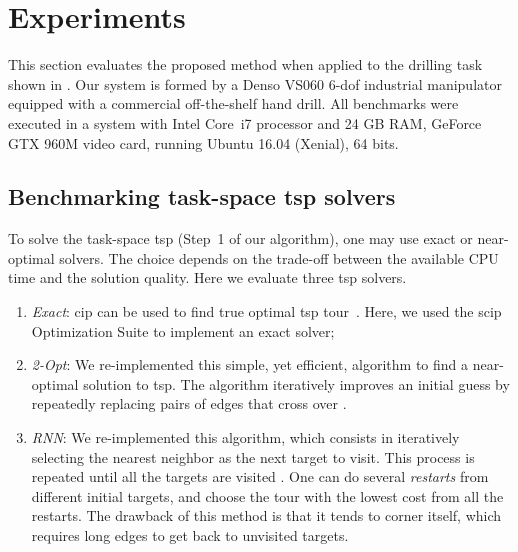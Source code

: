 \section{Experiments}
\label{sec:experiments}

This section evaluates the proposed method when applied to the drilling task
shown in . Our system is formed by a Denso VS060 6-\ac{dof}
industrial manipulator equipped with a commercial off-the-shelf hand drill. All
benchmarks were executed in a system with Intel\textsuperscript{\textregistered}
Core\texttrademark~i7 processor and 24 GB RAM, GeForce GTX 960M video card,
running Ubuntu 16.04 (Xenial), 64 bits.

\subsection{Benchmarking task-space \ac{tsp} solvers}
\label{sec:tsp_comparison}

To solve the task-space \ac{tsp} (Step~1 of our algorithm), one may use exact or
near-optimal solvers. The choice depends on the trade-off between the available
CPU time and the solution quality. Here we evaluate three \ac{tsp} solvers.

\begin{enumerate}

  \item \textit{Exact}: \ac{cip} can be used to find true optimal \ac{tsp}
  tour~\cite{Applegate2011}. Here, we used the \acs{scip} Optimization Suite
  \cite{Achterberg2009} to implement an exact solver;

  \item \textit{2-Opt}: We re-implemented this simple, yet efficient, algorithm
  to find a near-optimal solution to \ac{tsp}. The algorithm iteratively
  improves an initial guess by repeatedly replacing pairs of edges that cross
  over \cite{Applegate2011}.

  \item \textit{RNN}: We re-implemented this algorithm, which consists in
  iteratively selecting the nearest neighbor as the next target to visit. This
  process is repeated until all the targets are visited \cite{Applegate2011}.
  One can do several \emph{restarts} from different initial targets, and choose
  the tour with the lowest cost from all the restarts. The drawback of this
  method is that it tends to corner itself, which requires long edges to get
  back to unvisited targets.

\end{enumerate}

